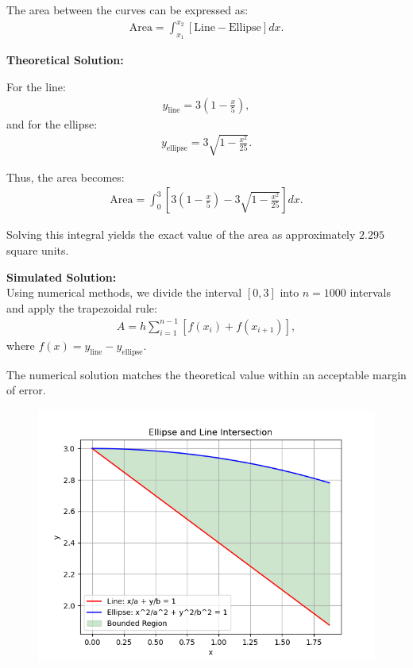 \documentclass[journal]{IEEEtran}
\begin{document}
The area between the curves can be expressed as:
\begin{align}
\text{Area} = \int_{x_1}^{x_2} \left[\text{Line} - \text{Ellipse}\right] dx.
\end{align}

\textbf{Theoretical Solution:}

For the line:
\begin{align}
y_{\text{line}} = 3\left(1 - \frac{x}{5}\right),
\end{align}
and for the ellipse:
\begin{align}
y_{\text{ellipse}} = 3\sqrt{1 - \frac{x^2}{25}}.
\end{align}

Thus, the area becomes:
\begin{align}
\text{Area} = \int_{0}^{3} \left[3\left(1 - \frac{x}{5}\right) - 3\sqrt{1 - \frac{x^2}{25}}\right] dx.
\end{align}

Solving this integral yields the exact value of the area as approximately \(2.295\) square units.

\textbf{Simulated Solution:}\\

Using numerical methods, we divide the interval \([0, 3]\) into \(n = 1000\) intervals and apply the trapezoidal rule:
\begin{align}
A = h \sum_{i=1}^{n-1} \left[f(x_i) + f(x_{i+1})\right],
\end{align}
where \(f(x) = y_{\text{line}} - y_{\text{ellipse}}\).

The numerical solution matches the theoretical value within an acceptable margin of error.

\begin{figure}[h!]
    \centering
    \includegraphics[width=1\columnwidth]{figs/fig.png}
    
    \label{ellipse_line_plot}
\end{figure}
\end{document}
